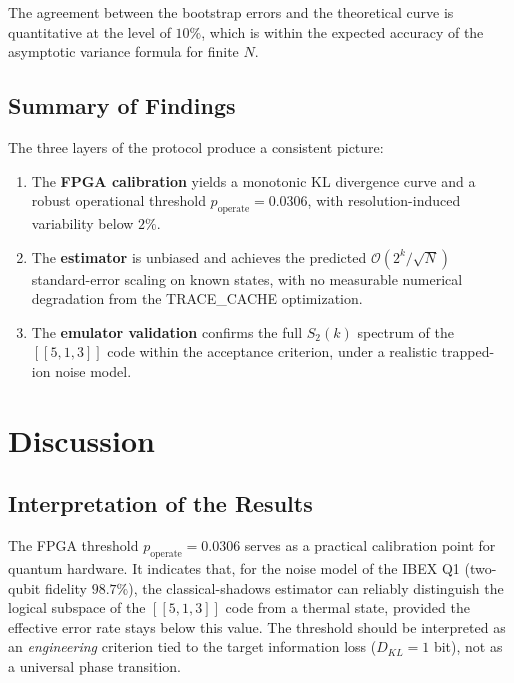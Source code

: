 \documentclass[12pt,a4paper,oneside]{book}
\theoremstyle{plain}
\theoremstyle{definition}
\theoremstyle{remark}
\begin{document}
The agreement between the bootstrap errors and the theoretical curve is quantitative at the level of $10\%$, which is within the expected accuracy of the asymptotic variance formula for finite $N$.

\section{Summary of Findings}
\label{sec:results_summary}

The three layers of the protocol produce a consistent picture:

\begin{enumerate}
    \item The \textbf{FPGA calibration} yields a monotonic KL divergence curve and a robust operational threshold $p_{\text{operate}} = 0.0306$, with resolution-induced variability below $2\%$.
    \item The \textbf{estimator} is unbiased and achieves the predicted $\mathcal{O}(2^k/\sqrt{N})$ standard-error scaling on known states, with no measurable numerical degradation from the TRACE\_CACHE optimization.
    \item The \textbf{emulator validation} confirms the full $S_2(k)$ spectrum of the $[[5,1,3]]$ code within the acceptance criterion, under a realistic trapped-ion noise model.
\end{enumerate}

\chapter{Discussion}
\label{chap:discussion}

\section{Interpretation of the Results}
\label{sec:disc_interpretation}

The FPGA threshold $p_{\text{operate}} = 0.0306$ serves as a practical calibration point for quantum hardware. It indicates that, for the noise model of the IBEX Q1 (two-qubit fidelity $98.7\%$), the classical-shadows estimator can reliably distinguish the logical subspace of the $[[5,1,3]]$ code from a thermal state, provided the effective error rate stays below this value. The threshold should be interpreted as an \emph{engineering} criterion tied to the target information loss ($D_{KL} = 1$ bit), not as a universal phase transition.
\end{document}
